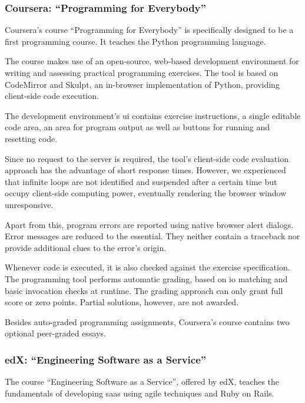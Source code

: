 \subsubsection{Coursera: \texorpdfstring{“Programming for Everybody”}{Programming for Everybody}}

Coursera's course ``Programming for Everybody'' is specifically designed to be a first programming course. It teaches the Python programming language.

The course makes use of an open-source, web-based development environment for writing and assessing practical programming exercises. The tool is based on CodeMirror and Skulpt, an in-browser implementation of Python, providing client-side code execution.

The development environment's \gls{ui} contains exercise instructions, a single editable code area, an area for program output as well as buttons for running and resetting code.

Since no request to the server is required, the tool's client-side code evaluation approach has the advantage of short response times. However, we experienced that infinite loops are not identified and suspended after a certain time but occupy client-side computing power, eventually rendering the browser window unresponsive.

Apart from this, program errors are reported using native browser alert dialogs. Error messages are reduced to the essential. They neither contain a traceback nor provide additional clues to the error's origin.

Whenever code is executed, it is also checked against the exercise specification. The programming tool performs automatic grading, based on \gls{io} matching and basic invocation checks at runtime. The grading approach can only grant full score or zero points. Partial solutions, however, are not awarded.

Besides auto-graded programming assignments, Coursera's course contains two optional peer-graded essays.

\subsubsection{edX: \texorpdfstring{“Engineering Software as a Service”}{Engineering Software as a Service}}

The course ``Engineering Software as a Service'', offered by edX, teaches the fundamentals of developing \gls{saas} using agile techniques and Ruby on Rails.

